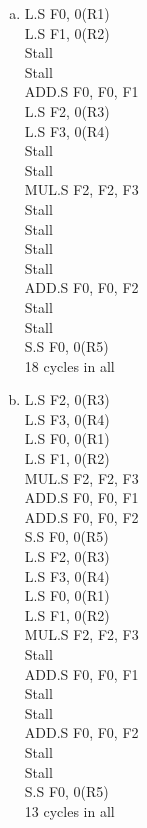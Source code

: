 \documentclass[12pt]{article}
\begin{document}
\begin{CJK*}{UTF8}{gbsn}
\begin{enumerate}[a)]
\item
L.S F0, 0(R1)\\
L.S F1, 0(R2)\\
Stall\\
Stall\\
ADD.S F0, F0, F1\\
L.S F2, 0(R3)\\
L.S F3, 0(R4)\\
Stall\\
Stall\\
MUL.S F2, F2, F3\\
Stall\\
Stall\\
Stall\\
Stall\\
ADD.S F0, F0, F2\\
Stall\\
Stall\\
S.S F0, 0(R5)\\

18 cycles in all\\

\item
L.S F2, 0(R3)\\
L.S F3, 0(R4)\\
L.S F0, 0(R1)\\
L.S F1, 0(R2)\\
MUL.S F2, F2, F3\\
ADD.S F0, F0, F1\\
ADD.S F0, F0, F2\\
S.S F0, 0(R5)\\

L.S F2, 0(R3)\\
L.S F3, 0(R4)\\
L.S F0, 0(R1)\\
L.S F1, 0(R2)\\
MUL.S F2, F2, F3\\
Stall\\
ADD.S F0, F0, F1\\
Stall\\
Stall\\
ADD.S F0, F0, F2\\
Stall\\
Stall\\
S.S F0, 0(R5)\\

13 cycles in all\\

\end{enumerate}


\end{CJK*}
\end{document}
